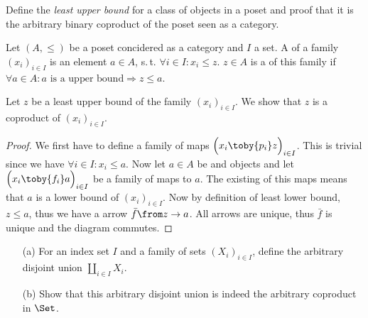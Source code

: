 \begin{exercise}
  Define the \emph{least upper bound} for a class of objects in a poset and proof that it is the arbitrary binary coproduct of the poset seen as a category.
\end{exercise}

\begin{answer}
  Let $(A, \le)$ be a poset concidered as a category and $I$ a set.
  A  of a family $(x_i)_{i\in I}$ is an element $a \in A$, s.\,t. $\forall i \in I: x_i \le z$.
  $z \in A$ is a  of this family if $\forall a \in A: \text{$a$ is a upper bound} \Rightarrow z \le a$.

  Let $z$ be a least upper bound of the family $(x_i)_{i\in I}$. We show that $z$ is a coproduct of $(x_i)_{i\in I}$.
  \begin{proof}
    We first have to define a family of maps $\Bigl(x_i \toby{p_i} z\Bigr)_{i \in I}$.
    This is trivial since we have $\forall i \in I: x_i \le a$.
    Now let $a \in A$ be and objects and let $\Bigl(x_i \toby{f_i} a\Bigr)_{i \in I}$ be a family of maps to $a$.
    The existing of this maps means that $a$ is a lower bound of $(x_i)_{i\in I}$.
    Now by definition of least lower bound, $z \le a$, thus we have a arrow $\bar{f} \from z \to a$.
    All arrows are unique, thus $\bar{f}$ is unique and the diagram commutes. \qedhere
  \end{proof}
\end{answer}

\begin{exercise}
  \begin{itemize}
    \item[(a)]For an index set $I$ and a family of sets $(X_i)_{i \in I}$, define the arbitrary disjoint union $\coprod_{i \in I}{X_i}$.
    \item[(b)]Show that this arbitrary disjoint union is indeed the arbitrary coproduct in $\Set$.
  \end{itemize}
\end{exercise}

